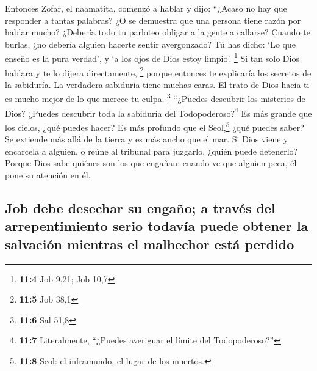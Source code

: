  Entonces Zofar, el naamatita, comenzó a hablar y dijo:
 ``¿Acaso no hay que responder a tantas palabras? ¿O se
demuestra que una persona tiene razón por hablar mucho? 
¿Debería todo tu parloteo obligar a la gente a callarse? Cuando te
burlas, ¿no debería alguien hacerte sentir avergonzado? 
Tú has dicho: `Lo que enseño es la pura verdad', y `a los ojos de Dios
estoy limpio'. \footnote{\textbf{11:4} Job 9,21; Job 10,7}
 Si tan solo Dios hablara y te lo dijera directamente,
\footnote{\textbf{11:5} Job 38,1}  porque entonces te
explicaría los secretos de la sabiduría. La verdadera sabiduría tiene
muchas caras. El trato de Dios hacia ti es mucho mejor de lo que merece
tu culpa. \footnote{\textbf{11:6} Sal 51,8}  ``¿Puedes
descubrir los misterios de Dios? ¿Puedes descubrir toda la sabiduría del
Todopoderoso?\footnote{\textbf{11:7} Literalmente, ``¿Puedes averiguar
  el límite del Todopoderoso?''}  Es más grande que los
cielos, ¿qué puedes hacer? Es más profundo que el Seol,\footnote{\textbf{11:8}
  Seol: el inframundo, el lugar de los muertos.} ¿qué puedes saber?
 Se extiende más allá de la tierra y es más ancho que el
mar.  Si Dios viene y encarcela a alguien, o reúne al
tribunal para juzgarlo, ¿quién puede detenerlo?  Porque
Dios sabe quiénes son los que engañan: cuando ve que alguien peca, él
pone su atención en él.

\hypertarget{job-debe-desechar-su-engauxf1o-a-travuxe9s-del-arrepentimiento-serio-todavuxeda-puede-obtener-la-salvaciuxf3n-mientras-el-malhechor-estuxe1-perdido}{%
\subsection{Job debe desechar su engaño; a través del arrepentimiento
serio todavía puede obtener la salvación mientras el malhechor está
perdido}\label{job-debe-desechar-su-engauxf1o-a-travuxe9s-del-arrepentimiento-serio-todavuxeda-puede-obtener-la-salvaciuxf3n-mientras-el-malhechor-estuxe1-perdido}}


